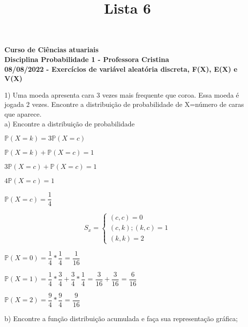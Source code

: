 \documentclass[12pt,a4paper]{article}
\title{Lista 6}
\date{}
\begin{document}
	
	\maketitle
	\begin{center}
		\textbf{Curso de Ciências atuariais}\\
		\textbf{Disciplina Probabilidade 1 - Professora Cristina}\\
		\textbf{08/08/2022  - Exercícios de variável aleatória discreta, 	F(X), E(X) e V(X)}
	\end{center}
	\vspace{1cm}
	1) Uma moeda apresenta cara 3 vezes mais frequente que coroa. Essa moeda é jogada 2 vezes. Encontre a distribuição de probabilidade de X=número de caras que aparece.\\
	a) Encontre a distribuição de probabilidade

\begin{center}
\vspace{0.25cm}
$\mathbb{P}(X=k) = 3\mathbb{P}(X=c)$

\vspace{1cm}
$\mathbb{P}(X=k) + \mathbb{P}(X=c) = 1$

$3\mathbb{P}(X=c) + \mathbb{P}(X=c) = 1$

$4\mathbb{P}(X=c) = 1$

$\mathbb{P}(X=c) = \dfrac{1}{4}$

\[
S_{x} =
\begin{cases}
(c,c) = 0 \\
(c,k);(k,c) = 1\\
(k,k) = 2
\end{cases}
\]

\vspace{0.5cm}
$\mathbb{P}(X=0) = \dfrac{1}{4}*\dfrac{1}{4}$ = $\dfrac{1}{16}$

\vspace{0.5cm}
$\mathbb{P}(X=1) = \dfrac{1}{4}*\dfrac{3}{4} + \dfrac{3}{4}*\dfrac{1}{4}$ = $\dfrac{3}{16} + \dfrac{3}{16}$ = $\dfrac{6}{16}$

\vspace{0.5cm}
$\mathbb{P}(X=2) = \dfrac{9}{4}*\dfrac{9}{4}$ = $\dfrac{9}{16}$
\end{center}

\vspace{1cm}
b) Encontre a função distribuição acumulada e faça sua representação gráfica;
\end{document}

